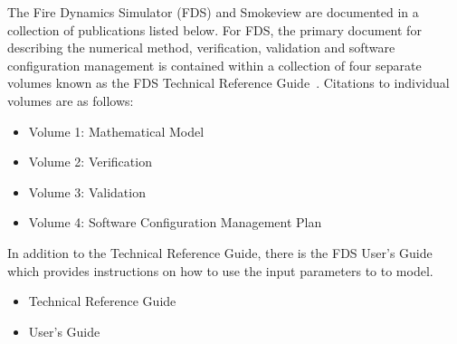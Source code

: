 \documentclass[10pt]{article}
\begin{document}
\noindent
The Fire Dynamics Simulator (FDS) and Smokeview are documented in a collection of publications listed below.
For FDS, the primary document for describing the numerical method, verification, validation and software configuration management is contained within a 
collection of four separate volumes known as the FDS Technical Reference Guide~\cite{FDS_Tech_Guide_5}. Citations to individual volumes are as follows:
\begin{itemize}
\item{Volume 1: Mathematical Model~\cite{FDS_Math_Guide_5}}
\item{Volume 2: Verification~\cite{FDS_Verification_Guide_5}}
\item{Volume 3: Validation~\cite{FDS_Validation_Guide_5}}
\item{Volume 4: Software Configuration Management Plan~\cite{FDS_Configuration_Management_Plan_5}}
\end{itemize}
In addition to the Technical Reference Guide, there is the FDS User's Guide~\cite{FDS_Users_Guide_5} which provides instructions on how to use the input parameters to to model.
\newline

\begin{itemize}
\item{Technical Reference Guide~\cite{Smokeview_Tech_Guide_5}}
\item{User's Guide~\cite{Smokeview_Users_Guide_5}}
\end{itemize}



\end{document}
